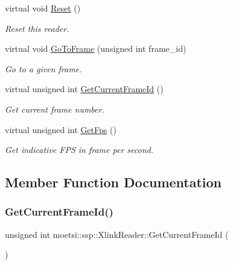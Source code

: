 \begin{DoxyCompactItemize}
\mbox{\label{classmoetsi_1_1ssp_1_1XlinkReader_a63c3fd708c67afb0b9f7a2289da3c818}} 
virtual void \hyperlink{classmoetsi_1_1ssp_1_1XlinkReader_a63c3fd708c67afb0b9f7a2289da3c818}{Reset} ()
\begin{DoxyCompactList}\small\item\em Reset this reader. \end{DoxyCompactList}\item 
virtual void \hyperlink{classmoetsi_1_1ssp_1_1XlinkReader_af540d074aeb4d3075db45c246fd48627}{Go\+To\+Frame} (unsigned int frame\+\_\+id)
\begin{DoxyCompactList}\small\item\em Go to a given frame. \end{DoxyCompactList}\item 
virtual unsigned int \hyperlink{classmoetsi_1_1ssp_1_1XlinkReader_ae11a3b07f2f036f87bc3d96685f61dae}{Get\+Current\+Frame\+Id} ()
\begin{DoxyCompactList}\small\item\em Get current frame number. \end{DoxyCompactList}\item 
virtual unsigned int \hyperlink{classmoetsi_1_1ssp_1_1XlinkReader_accfec6799b561107f27240e5324aa5d4}{Get\+Fps} ()
\begin{DoxyCompactList}\small\item\em Get indicative F\+PS in frame per second. \end{DoxyCompactList}\end{DoxyCompactItemize}


\subsection{Member Function Documentation}
\mbox{\label{classmoetsi_1_1ssp_1_1XlinkReader_ae11a3b07f2f036f87bc3d96685f61dae}} 
\subsubsection{\texorpdfstring{Get\+Current\+Frame\+Id()}{GetCurrentFrameId()}}
{\footnotesize\ttfamily unsigned int moetsi\+::ssp\+::\+Xlink\+Reader\+::\+Get\+Current\+Frame\+Id (\begin{DoxyParamCaption}{ }\end{DoxyParamCaption})\hspace{0.3cm}{\ttfamily [virtual]}}



